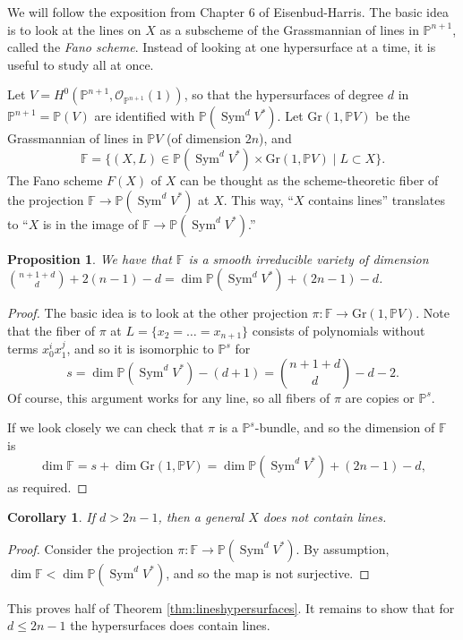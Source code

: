 \documentclass[leqno, openany]{memoir}
\newtheorem{cor}[thm]{Corollary}
\newtheorem{prop}[thm]{Proposition}
\theoremstyle{definition}
\theoremstyle{remark}
\theoremstyle{plain}
\theoremstyle{definition}
\theoremstyle{remark}
\newcommand{\Gr}{\mathrm{Gr}}
\newcommand{\F}{\mathbb{F}}
\renewcommand{\P}{\mathbb{P}}
\newcommand{\mc}[1]{\mathcal{#1}}
\DeclareMathOperator{\Sym}{Sym}
\begin{document}
We will follow the exposition from Chapter 6 of Eisenbud-Harris. The basic idea is to look at the lines on $X$ as a subscheme of the Grassmannian of lines in $\P^{n+1}$, called the \textit{Fano scheme}. Instead of looking at one hypersurface at a time, it is useful to study all at once.

Let $V=H^0(\P^{n+1}, \mc{O}_{\P^{n+1}}(1))$, so that the hypersurfaces of degree $d$ in $\P^{n+1}=\P(V)$ are identified with $\P(\Sym^d V^\ast)$. Let $\Gr(1, \P V)$ be the Grassmannian of lines in $\P V$ (of dimension $2n$), and
\[ \F = \{ (X, L) \in \P(\Sym^d V^\ast) \times \Gr(1, \P V) \mid L \subset X \}. \]
The Fano scheme $F(X)$ of $X$ can be thought as the scheme-theoretic fiber of the projection $\F \to \P(\Sym^d V^\ast)$ at $X$. This way, ``$X$ contains lines'' translates to ``$X$ is in the image of $\F \to \P(\Sym^d V^\ast)$.''

\begin{prop}
We have that $\F$ is a smooth irreducible variety of dimension $\binom{n+1+d}{d}+2(n-1)-d = \dim \P(\Sym^d V^\ast)+(2n-1)-d$.
\end{prop}

\begin{proof}
The basic idea is to look at the other projection $\pi\colon \F \to \Gr(1, \P V)$. Note that the fiber of $\pi$ at $L=\{x_2=\dots=x_{n+1}\}$ consists of polynomials without terms $x_0^ix_1^j$, and so it is isomorphic to $\P^s$ for
\[ s=\dim \P(\Sym^d V^\ast) -(d+1) = \binom{n+1+d}{d}-d-2. \]
Of course, this argument works for any line, so all fibers of $\pi$ are copies or $\P^s$.

If we look closely we can check that $\pi$ is a $\P^s$-bundle, and so the dimension of $\F$ is 
\[ \dim \F = s+\dim \Gr(1, \P V) = \dim \P(\Sym^d V^\ast)+(2n-1)-d, \]
as required.
\end{proof}

\begin{cor}
If $d>2n-1$, then a general $X$ does not contain lines. 
\end{cor}

\begin{proof}
Consider the projection $\pi\colon \F\to \P(\Sym^d V^\ast)$. By assumption, $\dim \F<\dim \P(\Sym^d V^\ast)$, and so the map is not surjective. 
\end{proof}

This proves half of Theorem \ref{thm:lineshypersurfaces}. It remains to show that for $d \leq 2n-1$ the hypersurfaces does contain lines. 
\end{document}
